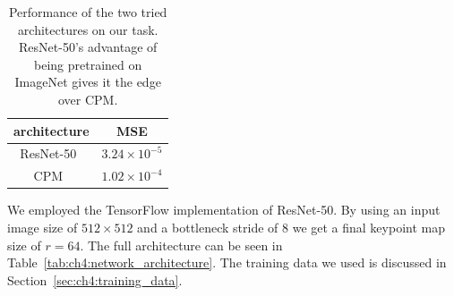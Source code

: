 \documentclass[10pt,twocolumn,letterpaper]{article}
\begin{document}
\begin{table}
    \centering
    \begin{tabular}{|c|c|}
        \hline
        architecture & MSE \\ \hline
        ResNet-50~\cite{He:2016:CVPR} & $3.24 \times 10^{-5}$ \\ \hline
        CPM~\cite{Wei:2016:CVPR} & $1.02 \times 10^{-4}$ \\ \hline
    \end{tabular}
    \caption[Architecture performance]{Performance of the two tried architectures on our task. ResNet-50's advantage of being pretrained on ImageNet gives it the edge over CPM.}
    \label{tab:ch4:net_performance}
\end{table}

We employed the TensorFlow implementation of ResNet-50. By using an input image
size of $512 \times 512$ and a bottleneck stride of 8 we get a final keypoint
map size of $r = 64$. The full architecture can be seen in Table~\ref{tab:ch4:network_architecture}.
The training data we used is discussed in Section~\ref{sec:ch4:training_data}.
\end{document}
